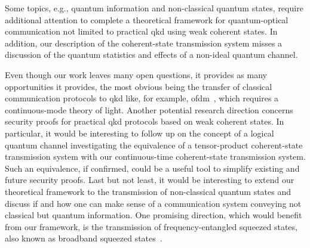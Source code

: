 Some topics, e.g., quantum information and non-classical quantum states, require additional attention to complete a theoretical framework for quantum-optical communication not limited to practical \gls{qkd} using weak coherent states.
In addition, our description of the coherent-state transmission system misses a discussion of the quantum statistics and effects of a non-ideal quantum channel.

Even though our work leaves many open questions, it provides as many opportunities it provides, the most obvious being the transfer of classical communication protocols to \gls{qkd} like, for example, \gls{ofdm}~\cite{Bahrani2015}, which requires a continuous-mode theory of light.
Another potential research direction concerns security proofs for practical \gls{qkd} protocols based on weak coherent states.
In particular, it would be interesting to follow up on the concept of a logical quantum channel investigating the equivalence of a tensor-product coherent-state transmission system with our continuous-time coherent-state transmission system.
Such an equivalence, if confirmed, could be a useful tool to simplify existing and future security proofs.
Last but not least, it would be interesting to extend our theoretical framework to the transmission of non-classical quantum states and discuss if and how one can make sense of a communication system conveying not classical but quantum information.
One promising direction, which would benefit from our framework, is the transmission of frequency-entangled squeezed states, also known as broadband squeezed states~\cite{Vogel2006,Mandel1995}.